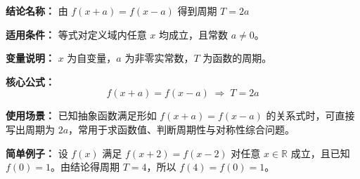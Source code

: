 \textbf{结论名称：} 由 \(f(x+a)=f(x-a)\) 得到周期 \(T=2a\)

\textbf{适用条件：} 等式对定义域内任意 \(x\) 均成立，且常数 \(a \neq 0\)。

\textbf{变量说明：} \(x\) 为自变量，\(a\) 为非零实常数，\(T\) 为函数的周期。

\textbf{核心公式：}
\[
\boxed{f(x+a) = f(x-a) \;\Longrightarrow\; T = 2a}
\]

\textbf{使用场景：} 已知抽象函数满足形如 \(f(x+a)=f(x-a)\) 的关系式时，可直接写出周期为 \(2a\)，常用于求函数值、判断周期性与对称性综合问题。

\textbf{简单例子：} 设 \(f(x)\) 满足 \(f(x+2)=f(x-2)\) 对任意 \(x\in\mathbb{R}\) 成立，且已知 \(f(0)=1\)。由结论得周期 \(T=4\)，所以 \(f(4)=f(0)=1\)。